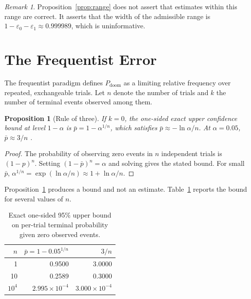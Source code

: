 \documentclass[11pt]{article}
\newtheorem{proposition}{Proposition}[section]
\theoremstyle{remark}
\newtheorem{remark}{Remark}[section]
\newcommand{\PD}{P_{\mathrm{doom}}}
\newcommand{\eone}{\varepsilon_1}
\newcommand{\ezero}{\varepsilon_0}
\begin{document}
\begin{remark}
Proposition~\ref{prop:range} does not assert that estimates within this range are correct. It asserts that the width of the admissible range is $1-\ezero-\eone\approx 0.999989$, which is uninformative.
\end{remark}

\section{The Frequentist Error}\label{sec:freq}

The frequentist paradigm defines $\PD$ as a limiting relative frequency over repeated, exchangeable trials. Let $n$ denote the number of trials and $k$ the number of terminal events observed among them.

\begin{proposition}[Rule of three]\label{prop:ro3}
If $k=0$, the one-sided exact upper confidence bound at level $1-\alpha$ is $\bar{p}=1-\alpha^{1/n}$, which satisfies $\bar{p}\approx -\ln\alpha/n$. At $\alpha=0.05$, $\bar{p}\approx 3/n$ \cite{hanley1983}.
\end{proposition}
\begin{proof}
The probability of observing zero events in $n$ independent trials is $(1-p)^n$. Setting $(1-\bar{p})^n=\alpha$ and solving gives the stated bound. For small $\bar p$, $\alpha^{1/n}=\exp(\ln\alpha/n)\approx 1+\ln\alpha/n$. \qedhere
\end{proof}

Proposition~\ref{prop:ro3} produces a bound and not an estimate. Table~\ref{tab:ro3} reports the bound for several values of $n$.

\begin{table}[h]
\centering
\caption{Exact one-sided 95\% upper bound on per-trial terminal probability given zero observed events.}\label{tab:ro3}
\begin{tabular}{@{}rrr@{}}
\toprule
$n$ & $\bar{p}=1-0.05^{1/n}$ & $3/n$ \\
\midrule
1 & 0.9500 & 3.0000 \\
10 & 0.2589 & 0.3000 \\
$10^{4}$ & $2.995\times10^{-4}$ & $3.000\times10^{-4}$ \\
\bottomrule
\end{tabular}
\end{table}
\end{document}
